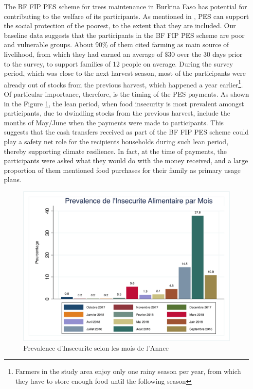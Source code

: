 \documentclass[preprint,12pt]{elsarticle}
\begin{document}
The BF FIP PES scheme for trees maintenance in Burkina Faso has  potential for contributing to the welfare of its participants. As mentioned in \citet{pagiola2005can}, PES can support the social protection of the poorest, to the extent that they are included. Our baseline data suggests that the participants in the BF FIP PES scheme are poor and vulnerable groups. About 90\% of them cited farming as main source of livelihood, from which they had earned an average of \$30 over the 30 days prior to the survey, to support families of 12 people on average. During the survey period, which was close to the next harvest season, most of the participants were already out of stocks from the previous harvest, which happened a year earlier\footnote{Farmers in the study area enjoy only one rainy season per year, from which they have to store enough food until the following season}.  
Of particular importance, therefore, is the timing of the PES payments. As shown in the Figure \ref{fig:FoodInsecure_bymonth}, the lean period, when food insecurity is most prevalent amongst participants, due to dwindling stocks from the previous harvest, include the months of May/June when the payments were made to participants. This suggests that the cash transfers received as part of the BF FIP PES scheme could play a safety net role for the recipients households during such lean period, thereby supporting climate resilience. In fact, at the time of payments, the participants were asked what they would do with the money received, and a large proportion of them mentioned food purchases for their family as primary usage plans.

\begin{figure}[ht!]
	\footnotesize
	\centering
	\caption{Prevalence d'Insecurite selon les mois de l'Annee \label{fig:FoodInsecure_bymonth}}
	\includegraphics[width=0.9\linewidth]{FoodInsecure_bymonth.png}
\end{figure}
\FloatBarrier
\end{document}
